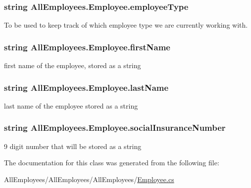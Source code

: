 \subsubsection[{employee\+Type}]{\setlength{\rightskip}{0pt plus 5cm}string All\+Employees.\+Employee.\+employee\+Type}\label{class_all_employees_1_1_employee_a246198254823dc5a10197029b17479b4}


To be used to keep track of which employee type we are currently working with. 

\hypertarget{class_all_employees_1_1_employee_a04c4c16015aa2d889fd2042ce4b8a1d7}{}
\subsubsection[{first\+Name}]{\setlength{\rightskip}{0pt plus 5cm}string All\+Employees.\+Employee.\+first\+Name}\label{class_all_employees_1_1_employee_a04c4c16015aa2d889fd2042ce4b8a1d7}


first name of the employee, stored as a string 

\hypertarget{class_all_employees_1_1_employee_ac3721b61919ca9cd29a400620562170e}{}
\subsubsection[{last\+Name}]{\setlength{\rightskip}{0pt plus 5cm}string All\+Employees.\+Employee.\+last\+Name}\label{class_all_employees_1_1_employee_ac3721b61919ca9cd29a400620562170e}


last name of the employee stored as a string 

\hypertarget{class_all_employees_1_1_employee_af589b347b218838839d5d736e3f83ef9}{}
\subsubsection[{social\+Insurance\+Number}]{\setlength{\rightskip}{0pt plus 5cm}string All\+Employees.\+Employee.\+social\+Insurance\+Number}\label{class_all_employees_1_1_employee_af589b347b218838839d5d736e3f83ef9}


9 digit number that will be stored as a string 



The documentation for this class was generated from the following file\+:\begin{DoxyCompactItemize}
\item 
All\+Employees/\+All\+Employees/\+All\+Employees/\hyperlink{_employee_8cs}{Employee.\+cs}\end{DoxyCompactItemize}
